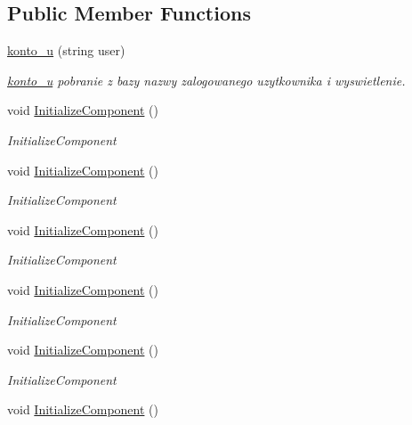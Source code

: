 \subsection*{Public Member Functions}
\begin{DoxyCompactItemize}
\item 
\mbox{\hyperlink{classprojekt_1_1konto__u_a3aac4a0ac7618c0eaf58f189236520f5}{konto\+\_\+u}} (string user)
\begin{DoxyCompactList}\small\item\em \mbox{\hyperlink{classprojekt_1_1konto__u}{konto\+\_\+u}} pobranie z bazy nazwy zalogowanego uzytkownika i wyswietlenie. \end{DoxyCompactList}\item 
void \mbox{\hyperlink{classprojekt_1_1konto__u_aba94445ce67074714f9c38935885c165}{Initialize\+Component}} ()
\begin{DoxyCompactList}\small\item\em Initialize\+Component \end{DoxyCompactList}\item 
void \mbox{\hyperlink{classprojekt_1_1konto__u_aba94445ce67074714f9c38935885c165}{Initialize\+Component}} ()
\begin{DoxyCompactList}\small\item\em Initialize\+Component \end{DoxyCompactList}\item 
void \mbox{\hyperlink{classprojekt_1_1konto__u_aba94445ce67074714f9c38935885c165}{Initialize\+Component}} ()
\begin{DoxyCompactList}\small\item\em Initialize\+Component \end{DoxyCompactList}\item 
void \mbox{\hyperlink{classprojekt_1_1konto__u_aba94445ce67074714f9c38935885c165}{Initialize\+Component}} ()
\begin{DoxyCompactList}\small\item\em Initialize\+Component \end{DoxyCompactList}\item 
void \mbox{\hyperlink{classprojekt_1_1konto__u_aba94445ce67074714f9c38935885c165}{Initialize\+Component}} ()
\begin{DoxyCompactList}\small\item\em Initialize\+Component \end{DoxyCompactList}\item 
void \mbox{\hyperlink{classprojekt_1_1konto__u_aba94445ce67074714f9c38935885c165}{Initialize\+Component}} ()

\end{DoxyCompactItemize}
